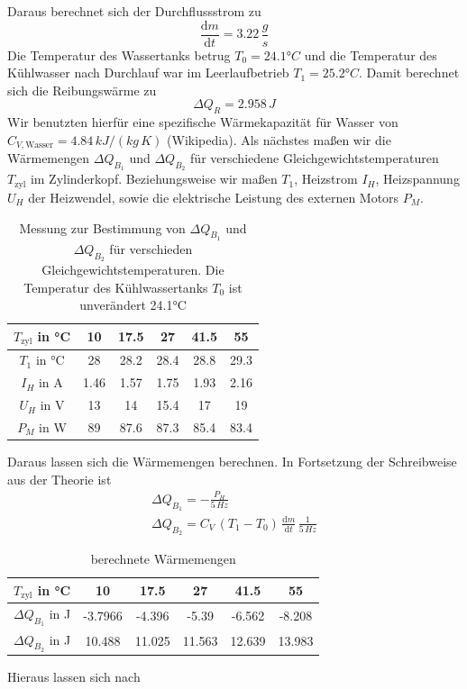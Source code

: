 \documentclass[a4paper, 12pt,]{scrartcl}
\begin{document}
Daraus berechnet sich der Durchflussstrom zu 
$$\frac{\text{d}m}{\text{d}t}=3.22\,\frac{g}{s}$$
Die Temperatur des Wassertanks betrug $T_0=24.1°C$ und die Temperatur des Kühlwasser nach Durchlauf war im Leerlaufbetrieb $T_1=25.2°C$. Damit berechnet sich die Reibungswärme zu 
\begin{equation*}\Delta{Q_R}=2.958\,J\end{equation*}
Wir benutzten hierfür eine spezifische Wärmekapazität für Wasser von $C_{V,\text{Wasser}}=4.84\,kJ/(kg\,K)$ (Wikipedia).\newline\newline
Als nächstes maßen wir die Wärmemengen $\Delta{Q_{B_1}}$ und $\Delta{Q_{B_2}}$ für verschiedene Gleichgewichtstemperaturen $T_\text{zyl}$ im Zylinderkopf. Beziehungsweise wir maßen $T_1$, Heizstrom $I_H$, Heizspannung $U_H$ der Heizwendel, sowie die elektrische Leistung des externen Motors $P_M$.
\begin{table}[H]\centering\begin{tabular}{c|ccccc}
$T_\text{zyl}$ in °C&10&17.5&27&41.5&55\\\hline
$T_1$ in °C&28	&28.2	&28.4	&28.8	&29.3\\
$I_H$ in A&1.46	&1.57	&1.75	&1.93	&2.16\\
$U_H$ in V&13	&14	&15.4	&17	&19\\
$P_M$ in W&89	&87.6	&87.3	&85.4	&83.4\end{tabular}
\caption{Messung zur Bestimmung von $\Delta{Q_{B_1}}$ und $\Delta{Q_{B_2}}$ für verschieden Gleichgewichtstemperaturen. Die Temperatur des Kühlwassertanks $T_0$ ist unverändert 24.1°C}\end{table}
Daraus lassen sich die Wärmemengen berechnen. In Fortsetzung der Schreibweise aus der Theorie ist
\begin{align*}
\Delta{Q_{B_1}}=-\frac{P_H}{5\,Hz}\\
\Delta{Q_{B_2}}=C_V\,(T_1-T_0)\,\frac{\text{d}m}{\text{d}t}\,\frac{1}{5\,Hz}\end{align*}
\begin{table}[H]\centering\begin{tabular}{c|ccccc}
$T_\text{zyl}$ in °C&10&17.5&27&41.5&55\\\hline
$\Delta{Q_{B_1}}$ in J&-3.7966&-4.396&-5.39&-6.562&-8.208\\
$\Delta{Q_{B_2}}$ in J&10.488&11.025&11.563&12.639&13.983\end{tabular}
\caption{berechnete Wärmemengen}\end{table}
Hieraus lassen sich nach 
\end{document}
